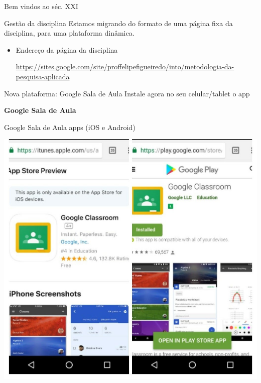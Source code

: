 \documentclass{beamer}
\begin{document}
\begin{frame}{Bem vindos ao séc. XXI}
  \begin{block}{Gestão da disciplina}
    Estamos migrando do formato de uma página fixa da disciplina, para uma plataforma dinâmica.
  \end{block}
  \begin{itemize}
  \item Endereço da página da disciplina

    \url{https://sites.google.com/site/proffelipefigueiredo/into/metodologia-da-pesquisa-aplicada}
  \end{itemize}
  \begin{block}{Nova plataforma: Google Sala de Aula}
    Instale agora no seu celular/tablet o app

    \bigskip
    {\bf Google Sala de Aula}
  \end{block}
\end{frame}

\begin{frame}{Google Sala de Aula apps (iOS e Android)}
  \begin{center}
    \includegraphics[height=\textheight]{Intro/gclassroom-apps}
  \end{center}
\end{frame}
\end{document}
